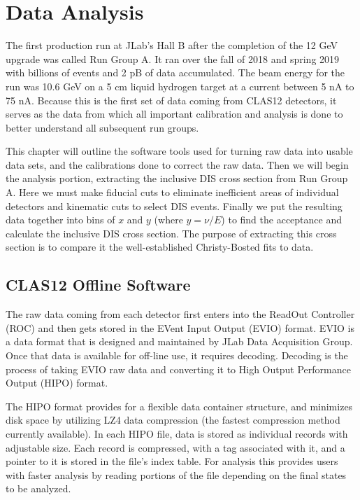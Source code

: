 \chapter{Data Analysis}
\label{ch:analysis}
The first production run at JLab's Hall B after the completion of the 12 GeV upgrade was called Run Group A. It ran over the fall of 2018 and spring 2019 with billions of events and 2 pB of data accumulated. The beam energy for the run was 10.6 GeV on a 5 cm liquid hydrogen target at a current between 5 nA to 75 nA. Because this is the first set of data coming from CLAS12 detectors, it serves as the data from which all important calibration and analysis is done to better understand all subsequent run groups.

This chapter will outline the software tools used for turning raw data into usable data sets, and the calibrations done to correct the raw data. Then we will begin the analysis portion, extracting the inclusive DIS cross section from Run Group A. Here we must make fiducial cuts to eliminate inefficient areas of individual detectors and kinematic cuts to select DIS events. Finally we put the resulting data together into bins of $x$ and $y$ (where $y=\nu/E$) to find the acceptance and calculate the inclusive DIS cross section. The purpose of extracting this cross section is to compare it the well-established Christy-Bosted fits to data.

\section{CLAS12 Offline Software}
The raw data coming from each detector first enters into the ReadOut Controller (ROC) and then gets stored in the EVent Input Output (EVIO) format. EVIO is a data format that is designed and maintained by JLab Data Acquisition Group. Once that data is available for off-line use, it requires decoding. Decoding is the process of taking EVIO raw data and converting it to High Output Performance Output (HIPO) format. 

The HIPO format provides for a flexible data container structure, and minimizes disk space by utilizing LZ4 data compression (the fastest compression method currently available). In each HIPO file, data is stored as individual records with adjustable size. Each record is compressed, with a tag associated with it, and a pointer to it is stored in the file's index table. For analysis this provides users with faster analysis by reading portions of the file depending on the final states to be analyzed.

